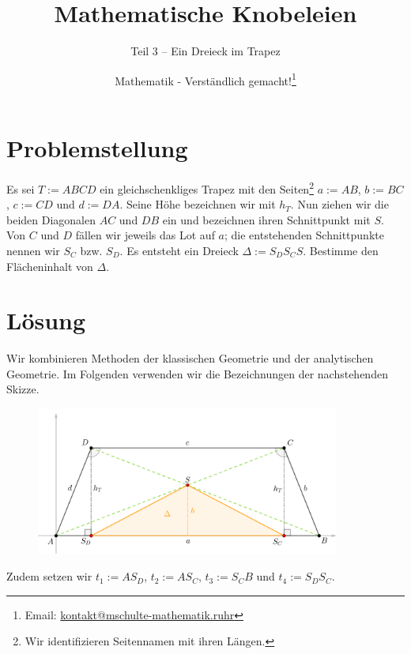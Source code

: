 \documentclass[]{scrartcl}
\title{Mathematische Knobeleien}
\subtitle{Teil 3 -- Ein Dreieck im Trapez}
\author{Mathematik - Verständlich gemacht!\footnote{Email: \href{mailto:kontakt@mschulte-mathematik.ruhr}{kontakt@mschulte-mathematik.ruhr}}}
\begin{document}
\maketitle

\section*{Problemstellung}
Es sei $T:=ABCD$ ein gleichschenkliges Trapez mit den 
Seiten\footnote{Wir identifizieren Seitennamen mit ihren 
Längen.} $a:=AB$, $b:=BC$, $c:=CD$ und $d:=DA$. Seine Höhe
bezeichnen wir mit $h_T$. Nun ziehen wir die
beiden Diagonalen $AC$ und $DB$ ein und bezeichnen ihren 
Schnittpunkt mit $S$. Von $C$ und $D$ fällen wir jeweils das
Lot auf $a$; die entstehenden Schnittpunkte nennen wir $S_C$ bzw.
$S_D$. Es entsteht ein Dreieck $\Delta := S_DS_CS$. 
Bestimme den Flächeninhalt von $\Delta$.

\section*{Lösung}
Wir kombinieren Methoden der klassischen Geometrie und der 
analytischen Geometrie. Im Folgenden verwenden wir die 
Bezeichnungen der nachstehenden Skizze.

\noindent 
\begin{figure}[h]
	\centering
	\includegraphics[width=10cm]{abbildungen/MaKno_3_Figur_1.png}
	\label{fig:1}
\end{figure}

\noindent 
Zudem setzen wir $t_1 := AS_D$, $t_2 := AS_C$, $t_3 := S_CB$ und 
$t_4 := S_DS_C$.
\end{document}
